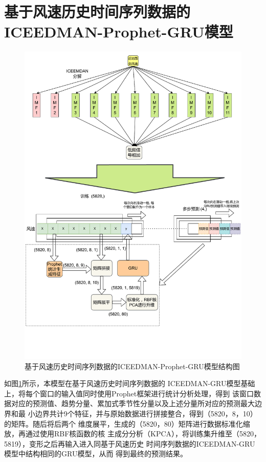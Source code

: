 \documentclass[AutoFakeBold]{LZUThesis}
\begin{document}
\section{基于风速历史时间序列数据的ICEEDMAN-Prophet-GRU模型}
\begin{figure}[H]
	\centering
    \includegraphics[width=1\textwidth]{figures/ICEEMDAN-Prophet-GRU-Wind.pdf}
    \caption{基于风速历史时间序列数据的ICEEDMAN-Prophet-GRU模型结构图}
    \label{fig_ICEEMDAN_Prophet_GRU_Wind}
\end{figure}

如图\ref{fig_ICEEMDAN_Prophet_GRU_Wind}所示，本模型在基于风速历史时间序列数据的
ICEEDMAN-GRU模型基础上，将每个窗口的输入值同时使用Prophet框架进行统计分析处理，得到
该窗口数据对应的预测值、趋势分量、累加式季节性分量以及上述分量所对应的预测最大边界和最
小边界共计9个特征，并与原始数据进行拼接整合，得到（5820，8，10）的矩阵。随后将后两个
维度展平，生成的（5820，80）矩阵进行数据标准化缩放，再通过使用RBF核函数的核
主成分分析（KPCA），将训练集升维至（5820，5819），变形之后再输入进入同基于风速历史
时间序列数据的ICEEDMAN-GRU模型中结构相同的GRU模型，从而
得到最终的预测结果。
\end{document}
